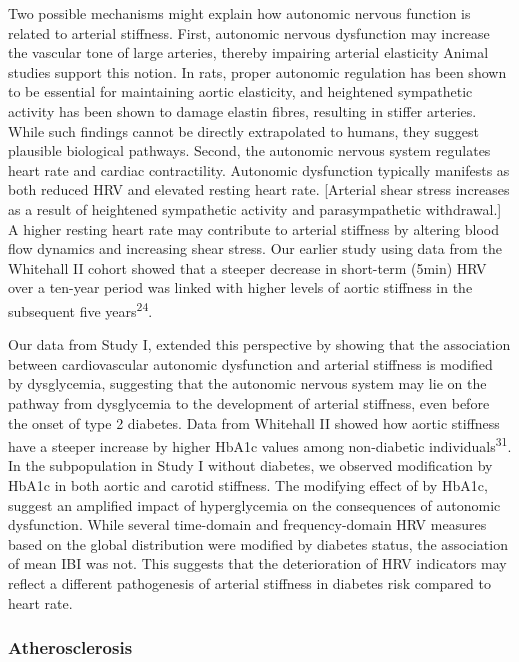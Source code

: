 \documentclass[
  a4paper,
  headsepline=true,
  open=any]{scrbook}
\begin{document}
Two possible mechanisms might explain how autonomic nervous function is
related to arterial stiffness. First, autonomic nervous dysfunction may
increase the vascular tone of large arteries, thereby impairing arterial
elasticity Animal studies support this notion. In rats, proper autonomic
regulation has been shown to be essential for maintaining aortic
elasticity, and heightened sympathetic activity has been shown to damage
elastin fibres, resulting in stiffer arteries. While such findings
cannot be directly extrapolated to humans, they suggest plausible
biological pathways. Second, the autonomic nervous system regulates
heart rate and cardiac contractility. Autonomic dysfunction typically
manifests as both reduced HRV and elevated resting heart rate.
{[}Arterial shear stress increases as a result of heightened sympathetic
activity and parasympathetic withdrawal.{]} A higher resting heart rate
may contribute to arterial stiffness by altering blood flow dynamics and
increasing shear stress. Our earlier study using data from the Whitehall
II cohort showed that a steeper decrease in short-term (5min) HRV over a
ten-year period was linked with higher levels of aortic stiffness in the
subsequent five years\textsuperscript{24}.

Our data from Study I, extended this perspective by showing that the
association between cardiovascular autonomic dysfunction and arterial
stiffness is modified by dysglycemia, suggesting that the autonomic
nervous system may lie on the pathway from dysglycemia to the
development of arterial stiffness, even before the onset of type 2
diabetes. Data from Whitehall II showed how aortic stiffness have a
steeper increase by higher HbA1c values among non-diabetic
individuals\textsuperscript{31}. In the subpopulation in Study I without
diabetes, we observed modification by HbA1c in both aortic and carotid
stiffness. The modifying effect of by HbA1c, suggest an amplified impact
of hyperglycemia on the consequences of autonomic dysfunction. While
several time-domain and frequency-domain HRV measures based on the
global distribution were modified by diabetes status, the association of
mean IBI was not. This suggests that the deterioration of HRV indicators
may reflect a different pathogenesis of arterial stiffness in diabetes
risk compared to heart rate.

\hypertarget{atherosclerosis-1}{%
\subsubsection{Atherosclerosis}\label{atherosclerosis-1}}
\end{document}

